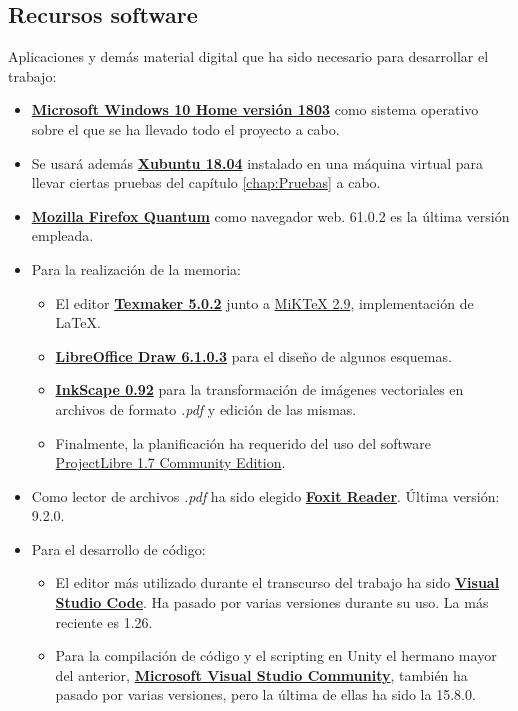 \subsection{Recursos software}
Aplicaciones y demás material digital que ha sido necesario para desarrollar el trabajo:
\begin{itemize}
\item \href{https://www.microsoft.com/es-es/windows}{\textbf{Microsoft Windows 10 Home versión 1803}} como sistema operativo sobre el que se ha llevado todo el proyecto a cabo.
\item Se usará además \href{https://xubuntu.org/about/}{\textbf{Xubuntu 18.04}} instalado en una máquina virtual para llevar ciertas pruebas del capítulo \ref{chap:Pruebas} a cabo.
\item \href{https://www.mozilla.org/es-ES/firefox/}{\textbf{Mozilla Firefox Quantum}} como navegador web. 61.0.2 es la última versión empleada.
\item Para la realización de la memoria:
\begin{itemize}
\item El editor \href{http://www.xm1math.net/texmaker/}{\textbf{Texmaker 5.0.2}} junto a \href{https://miktex.org/about}{MiKTeX 2.9}, implementación de \LaTeX.
\item \href{https://es.libreoffice.org/descubre/draw/}{\textbf{LibreOffice Draw 6.1.0.3}} para el diseño de algunos esquemas.
\item \href{https://inkscape.org/es/}{\textbf{InkScape 0.92}} para la transformación de imágenes vectoriales en archivos de formato \textit{.pdf} y edición de las mismas.
\item Finalmente, la planificación ha requerido del uso del software \href{http://www.projectlibre.com/}{ProjectLibre 1.7 Community Edition}.
\end{itemize}
\item Como lector de archivos \textit{.pdf} ha sido elegido \href{https://www.foxitsoftware.com/pdf-reader/}{\textbf{Foxit Reader}}. Última versión: 9.2.0.
\item Para el desarrollo de código:
\begin{itemize}
\item El editor más utilizado durante el transcurso del trabajo ha sido \href{https://code.visualstudio.com/}{\textbf{Visual Studio Code}}. Ha pasado por varias versiones durante su uso. La más reciente es 1.26.
\item Para la compilación de código y el scripting en Unity el hermano mayor del anterior, \href{https://visualstudio.microsoft.com/es/}{\textbf{Microsoft Visual Studio Community}}, también ha pasado por varias versiones, pero la última de ellas ha sido la 15.8.0.

\end{itemize}
\end{itemize}
